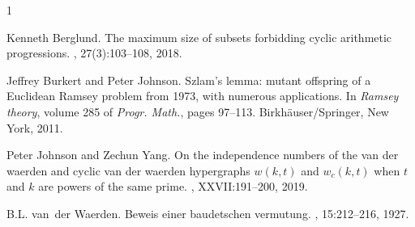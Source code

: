 \documentclass{article}
\theoremstyle{definition}
\theoremstyle{remark}
\begin{document}
\begin{thebibliography}{1}

Kenneth Berglund.
\newblock The maximum size of subsets forbidding cyclic arithmetic progressions.
, 27(3):103--108, 2018.

Jeffrey Burkert and Peter Johnson.
\newblock Szlam's lemma: mutant offspring of a {E}uclidean {R}amsey problem from 1973, with numerous applications.
\newblock In {\em Ramsey theory}, volume 285 of {\em Progr. Math.}, pages 97--113. Birkh\"{a}user/Springer, New York, 2011.

Peter Johnson and Zechun Yang.
\newblock On the independence numbers of the van der waerden and cyclic van der waerden hypergraphs $w(k,t)$ and $w_{c}(k,t)$ when $t$ and $k$ are powers of the same prime.
, XXVII:191--200, 2019.

B.L. van~der Waerden.
\newblock Beweis einer baudetschen vermutung.
, 15:212--216, 1927.

\end{thebibliography}
\end{document}
